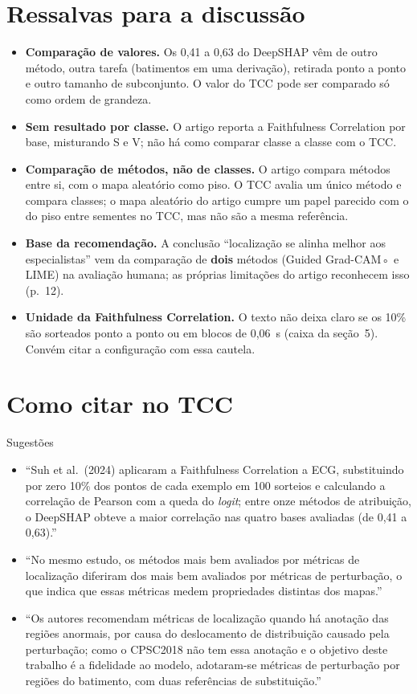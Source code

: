\documentclass[11pt,a4paper]{article}
\begin{document}
\section{Ressalvas para a discussão}\label{sec:suh-ressalvas}
\begin{itemize}
\item \textbf{Comparação de valores.} Os 0,41 a 0,63 do DeepSHAP vêm de outro método, outra tarefa (batimentos em uma derivação), retirada ponto a ponto e outro tamanho de subconjunto. O valor do TCC pode ser comparado só como ordem de grandeza.
\item \textbf{Sem resultado por classe.} O artigo reporta a Faithfulness Correlation por base, misturando S e V; não há como comparar classe a classe com o TCC.
\item \textbf{Comparação de métodos, não de classes.} O artigo compara métodos entre si, com o mapa aleatório como piso. O TCC avalia um único método e compara classes; o mapa aleatório do artigo cumpre um papel parecido com o do piso entre sementes no TCC, mas não são a mesma referência.
\item \textbf{Base da recomendação.} A conclusão “localização se alinha melhor aos especialistas” vem da comparação de \textbf{dois} métodos (Guided Grad-CAM◦ e LIME) na avaliação humana; as próprias limitações do artigo reconhecem isso (p.~12).
\item \textbf{Unidade da Faithfulness Correlation.} O texto não deixa claro se os 10\% são sorteados ponto a ponto ou em blocos de 0,06~s (caixa da seção~5). Convém citar a configuração com essa cautela.
\end{itemize}

\section{Como citar no TCC}
\begin{infobox}[ok]{Sugestões}
\begin{itemize}
\item “Suh et al.\ (2024) aplicaram a Faithfulness Correlation a ECG, substituindo por zero 10\% dos pontos de cada exemplo em 100 sorteios e calculando a correlação de Pearson com a queda do \textit{logit}; entre onze métodos de atribuição, o DeepSHAP obteve a maior correlação nas quatro bases avaliadas (de 0,41 a 0,63).”
\item “No mesmo estudo, os métodos mais bem avaliados por métricas de localização diferiram dos mais bem avaliados por métricas de perturbação, o que indica que essas métricas medem propriedades distintas dos mapas.”
\item “Os autores recomendam métricas de localização quando há anotação das regiões anormais, por causa do deslocamento de distribuição causado pela perturbação; como o CPSC2018 não tem essa anotação e o objetivo deste trabalho é a fidelidade ao modelo, adotaram-se métricas de perturbação por regiões do batimento, com duas referências de substituição.”
\end{itemize}
\end{infobox}
\end{document}

